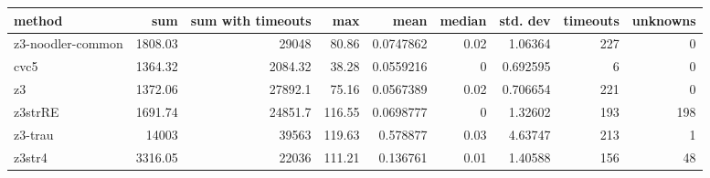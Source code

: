 \begin{tabular}{lrrrrrrrr}
\hline
 method            &      sum &   sum with timeouts &    max &      mean &   median &   std. dev &   timeouts &   unknowns \\
\hline
 z3-noodler-common &  1808.03 &            29048    &  80.86 & 0.0747862 &     0.02 &   1.06364  &        227 &          0 \\
 cvc5              &  1364.32 &             2084.32 &  38.28 & 0.0559216 &     0    &   0.692595 &          6 &          0 \\
 z3                &  1372.06 &            27892.1  &  75.16 & 0.0567389 &     0.02 &   0.706654 &        221 &          0 \\
 z3strRE           &  1691.74 &            24851.7  & 116.55 & 0.0698777 &     0    &   1.32602  &        193 &        198 \\
 z3-trau           & 14003    &            39563    & 119.63 & 0.578877  &     0.03 &   4.63747  &        213 &          1 \\
 z3str4            &  3316.05 &            22036    & 111.21 & 0.136761  &     0.01 &   1.40588  &        156 &         48 \\
\hline
\end{tabular}
